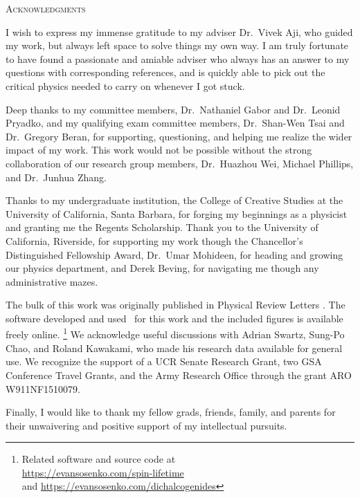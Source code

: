 \clearpage
\centering
\vspace*{-\toptafiddle}

\textsc{Acknowledgments}

\justify{}
\DoubleSpacing{}
I wish to express my immense gratitude to my adviser Dr.\ Vivek Aji,
who guided my work, but always left space to solve things my own way.
I am truly fortunate to have found a passionate and amiable adviser who
always has an answer to my questions with corresponding references,
and is quickly able to pick out the critical physics
needed to carry on whenever I got stuck.

Deep thanks to my committee members,
Dr.\ Nathaniel Gabor and Dr.\ Leonid Pryadko,
and my qualifying exam committee members,
Dr.\ Shan-Wen Tsai and Dr.\ Gregory Beran,
for supporting, questioning,
and helping me realize the wider impact of my work.
This work would not be possible without the strong collaboration
of our research group members, Dr.\ Huazhou Wei, Michael Phillips,
and Dr.\ Junhua Zhang.

Thanks to my undergraduate institution,
the College of Creative Studies at
the University of California, Santa Barbara,
for forging my beginnings as a physicist
and granting me the Regents Scholarship.
Thank you to the University of California, Riverside,
for supporting my work though the
Chancellor's Distinguished Fellowship Award,
Dr.\ Umar Mohideen, for heading and growing our physics department,
and Derek Beving, for navigating me though any administrative mazes.

The bulk of this work was originally published in
Physical Review Letters
\cite{%
  PhysRevB.89.245436,%
  1512.01261v2%
}.
The software developed
and used~\cite{Hunter:2007} for this work
and the included figures is available freely online.%
\footnote{%
  Related software and source code at \\
  \url{https://evansosenko.com/spin-lifetime}
  \\
  and \url{https://evansosenko.com/dichalcogenides}
}
We acknowledge useful discussions with
Adrian Swartz, Sung-Po Chao, and Roland Kawakami,
who made his research data available for general use.
We recognize the support of a UCR Senate Research Grant,
two GSA Conference Travel Grants,
and the Army Research Office through the grant
ARO W911NF1510079.

Finally, I would like to thank my fellow grads, friends, family, and parents
for their unwaivering and positive support of my intellectual pursuits.
\enlargethispage{\bottafiddle}
\clearpage
